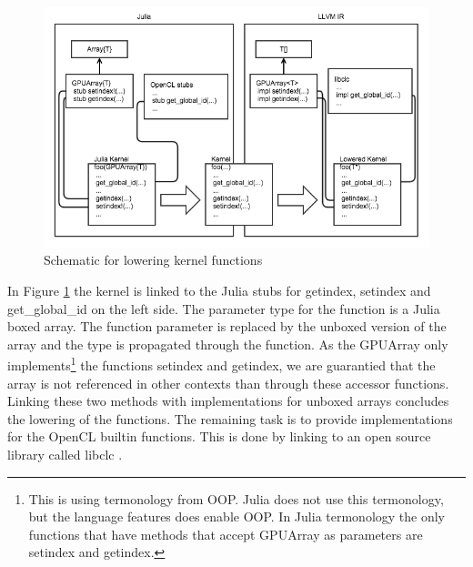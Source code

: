 \begin{markdown}
\begin{figure}[H]
  \centering
  \includegraphics[width=1\textwidth]{body/figures/lowering_schematic.png}
  \caption{Schematic for lowering kernel functions}
  \label{fig:lowering}
\end{figure}

In Figure \ref{fig:lowering} the kernel is linked to the Julia stubs
for getindex, setindex and get_global_id on the left side. The
parameter type for the function is a Julia boxed array. The function
parameter is replaced by the unboxed version of the array and the type
is propagated through the function. As the GPUArray only
implements\footnote{This is using termonology from OOP. Julia does not
  use this termonology, but the language features does enable OOP. In
  Julia termonology the only functions that have methods that accept
  GPUArray as parameters are setindex and getindex.} the functions
setindex and getindex, we are guarantied that the array is not
referenced in other contexts than through these accessor functions.
Linking these two methods with implementations for unboxed arrays
concludes the lowering of the functions. The remaining task is to
provide implementations for the OpenCL builtin functions. This is done
by linking to an open source library called libclc \cite{libclc}.

  
\end{markdown}
